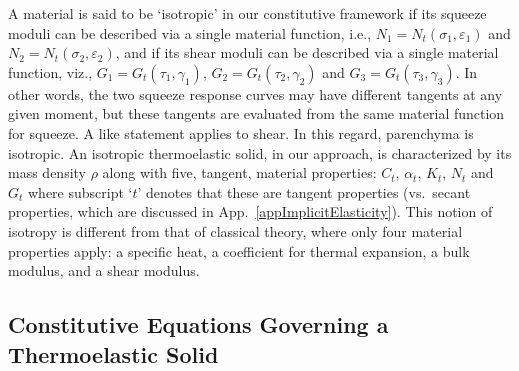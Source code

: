 A material is said to be `isotropic' in our constitutive framework if its squeeze moduli can be described via a single material function, i.e., $N_1 = N_t (\sigma_1 , \varepsilon_1 )$ and $N_2 = N_t ( \sigma_2 , \varepsilon_2 )$, and if its shear moduli can be described via a single material function, viz., $G_1 = G_t ( \tau_1 , \gamma_1 )$, $G_2 = G_t ( \tau_2 , \gamma_2 )$ and $G_3 = G_t ( \tau_3 , \gamma_3 )$.  In other words, the two squeeze response curves may have different tangents at any given moment, but these tangents are evaluated from the same material function for squeeze.  A like statement applies to shear.  In this regard, parenchyma is isotropic.  An isotropic thermo\-elastic solid, in our approach, is characterized by its mass density $\rho$ along with five, tangent, material properties: $C_t$, $\alpha_t$, $K_t$, $N_t$ and $G_t$ where subscript `$t$' denotes that these are tangent properties (vs.\ secant properties, which are discussed in App.~\ref{appImplicitElasticity}).  This notion of isotropy is different from that of classical theory, where only four material properties apply: a specific heat, a coefficient for thermal expansion, a bulk modulus, and a shear modulus.

\subsection{Constitutive Equations Governing a Thermoelastic Solid}

